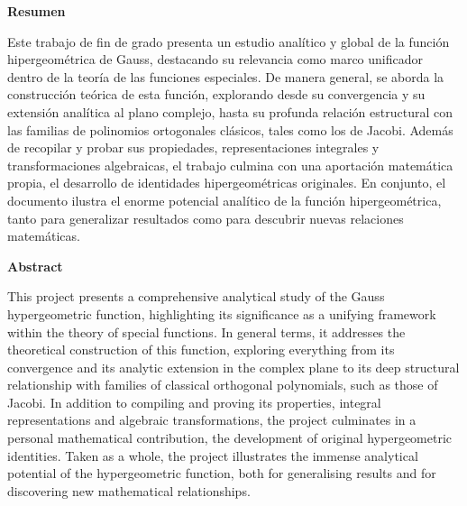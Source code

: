 \documentclass[12pt,a4paper]{book}
\begin{document}
\newpage
\thispagestyle{empty}
\begin{flushleft}
    {\Large \textbf{Resumen}}
\end{flushleft}
Este trabajo de fin de grado presenta un estudio analítico y global de la función hipergeométrica de Gauss, destacando su relevancia como marco unificador dentro de la teoría de las funciones especiales. De manera general, se aborda la construcción teórica de esta función, explorando desde su convergencia y su extensión analítica al plano complejo, hasta su profunda relación estructural con las familias de polinomios ortogonales clásicos, tales como los de Jacobi. Además de recopilar y probar sus propiedades, representaciones integrales y transformaciones algebraicas, el trabajo culmina con una aportación matemática propia, el desarrollo de identidades hipergeométricas originales. En conjunto, el documento ilustra el enorme potencial analítico de la función hipergeométrica, tanto para generalizar resultados como para descubrir nuevas relaciones matemáticas.

\vspace{1.5cm} 


\begin{flushleft}
    {\Large \textbf{Abstract}}
\end{flushleft}
This project presents a comprehensive analytical study of the Gauss hypergeometric function, highlighting its significance as a unifying framework within the theory of special functions. In general terms, it addresses the theoretical construction of this function, exploring everything from its convergence and its analytic extension in the complex plane to its deep structural relationship with families of classical orthogonal polynomials, such as those of Jacobi. In addition to compiling and proving its properties, integral representations and algebraic transformations, the project culminates in a personal mathematical contribution, the development of original hypergeometric identities. Taken as a whole, the project illustrates the immense analytical potential of the hypergeometric function, both for generalising results and for discovering new mathematical relationships.


\newpage
\thispagestyle{empty}
\null
\newpage

\renewcommand{\contentsname}{Índice general}
\renewcommand{\chaptername}{Capítulo}
\renewcommand{\proofname}{Demostración}
\end{document}
